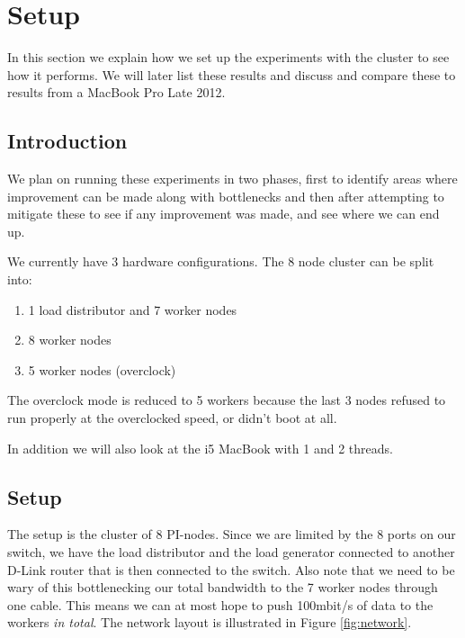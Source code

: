 \clearpage

\section{Setup}
\label{sec:experiments}
In this section we explain how we set up the experiments with the cluster to see how it performs. We will later list these results and discuss and compare these to results from a MacBook Pro Late 2012. 

\subsection{Introduction}
We plan on running these experiments in two phases, first to identify areas where improvement can be made along with bottlenecks and then after attempting to mitigate these to see if any improvement was made, and see where we can end up.

We currently have 3 hardware configurations. The 8 node cluster can be split into:

\begin{enumerate}
\item 1 load distributor and 7 worker nodes
\item 8 worker nodes
\item 5 worker nodes (overclock)
\end{enumerate}

The overclock mode is reduced to 5 workers because the last 3 nodes refused to run properly at the overclocked speed, or didn't boot at all.

In addition we will also look at the i5 MacBook with 1 and 2 threads.

\subsection{Setup}
The setup is the cluster of 8 PI-nodes. Since we are limited by the 8 ports on our switch, we have the load distributor and the load generator connected to another D-Link router that is then connected to the switch.
Also note that we need to be wary of this bottlenecking our total bandwidth to the 7 worker nodes through one cable.
This means we can at most hope to push 100mbit/s of data to the workers {\em in total}.
The network layout is illustrated in Figure \ref{fig:network}.

